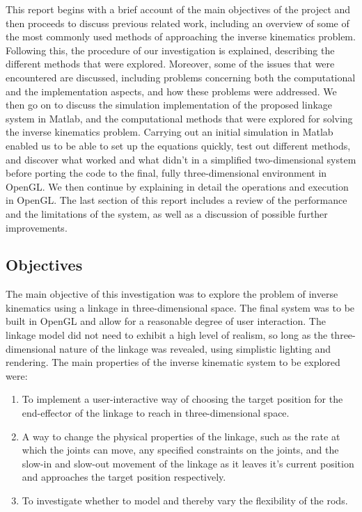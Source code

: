 \documentclass[paper=a4, fontsize=11pt]{scrartcl} %
\numberwithin{equation}{section} %
\numberwithin{figure}{section} %
\numberwithin{table}{section} %
\begin{document}
This report begins with a brief account of the main objectives of the project and then proceeds to discuss previous related work, including an overview of some of the most commonly used methods of approaching the inverse kinematics problem. Following this, the procedure of our investigation is explained, describing the different methods that were explored. Moreover, some of the issues that were encountered are discussed, including problems concerning both the computational and the implementation aspects, and how these problems were addressed. We then go on to discuss the simulation implementation of the proposed linkage system in Matlab, and the computational methods that were explored for solving the inverse kinematics problem. Carrying out an initial simulation in Matlab enabled us to be able to set up the equations quickly, test out different methods, and discover what worked and what didn't in a simplified two-dimensional system before porting the code to the final, fully three-dimensional environment in OpenGL. We then continue by explaining in detail the operations and execution in OpenGL. The last section of this report includes a review of the performance and the limitations of the system, as well as a discussion of possible further improvements.

\subsection{Objectives}

The main objective of this investigation was to explore the problem of inverse kinematics using a linkage in three-dimensional space. The final system was to be built in OpenGL and allow for a reasonable degree of user interaction. The linkage model did not need to exhibit a high level of realism, so long as the three-dimensional nature of the linkage was revealed, using simplistic lighting and rendering. The main properties of the inverse kinematic system to be explored were:

\begin{enumerate}
\item
To implement a user-interactive way of choosing the target position for the end-effector of the linkage to reach in three-dimensional space.

\item
A way to change the physical properties of the linkage, such as the rate at which the joints can move, any specified constraints on the joints, and the slow-in and slow-out movement of the linkage as it leaves it's current position and approaches the target position respectively.

\item
To investigate whether to model and thereby vary the flexibility of the rods.
\end{enumerate} 
\end{document}
